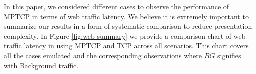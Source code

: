 In this paper, we considered different cases to observe the performance of MPTCP in terms of web traffic latency. We believe it is extremely important to
summarize our results in a form of systematic comparison to reduce presentation complexity. In Figure \ref{fig:web-summary} we provide a comparison 
chart of web traffic latency in using MPTCP and TCP across all scenarios. This chart covers all the cases emulated and the corresponding observations where $BG$ signifies with Background traffic. 
